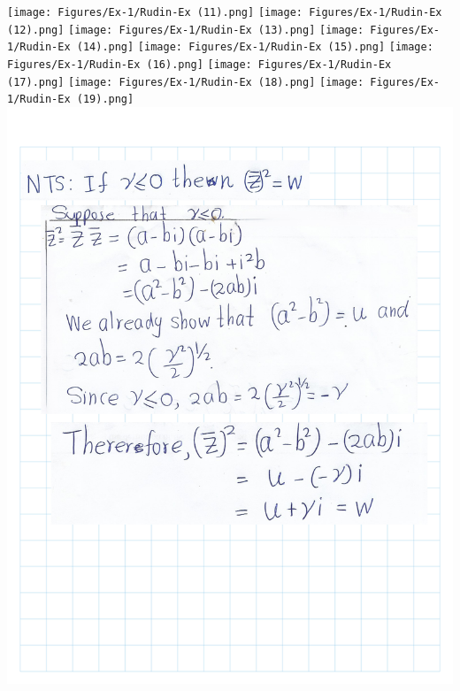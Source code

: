 \documentclass[
]{book}
\theoremstyle{definition}
\theoremstyle{definition}
\theoremstyle{definition}
\theoremstyle{definition}
\theoremstyle{remark}
\begin{document}
\texttt{[image: Figures/Ex-1/Rudin-Ex (11).png]}
\texttt{[image: Figures/Ex-1/Rudin-Ex (12).png]}
\texttt{[image: Figures/Ex-1/Rudin-Ex (13).png]}
\texttt{[image: Figures/Ex-1/Rudin-Ex (14).png]}
\texttt{[image: Figures/Ex-1/Rudin-Ex (15).png]}
\texttt{[image: Figures/Ex-1/Rudin-Ex (16).png]}
\texttt{[image: Figures/Ex-1/Rudin-Ex (17).png]}
\texttt{[image: Figures/Ex-1/Rudin-Ex (18).png]}
\texttt{[image: Figures/Ex-1/Rudin-Ex (19).png]}
\includegraphics{Figures/Ex-1/Rudin-Ex (20).png}
\end{document}
